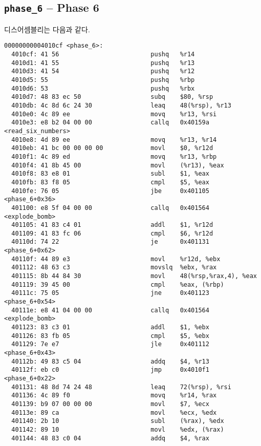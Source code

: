 \documentclass{scrartcl}
\begin{document}
\subsection{\texttt{phase\_6} -- Phase 6}
디스어셈블리는 다음과 같다.
\begin{lstlisting}
00000000004010cf <phase_6>:
  4010cf: 41 56                         pushq   %r14
  4010d1: 41 55                         pushq   %r13
  4010d3: 41 54                         pushq   %r12
  4010d5: 55                            pushq   %rbp
  4010d6: 53                            pushq   %rbx
  4010d7: 48 83 ec 50                   subq    $80, %rsp
  4010db: 4c 8d 6c 24 30                leaq    48(%rsp), %r13
  4010e0: 4c 89 ee                      movq    %r13, %rsi
  4010e3: e8 b2 04 00 00                callq   0x40159a <read_six_numbers>
  4010e8: 4d 89 ee                      movq    %r13, %r14
  4010eb: 41 bc 00 00 00 00             movl    $0, %r12d
  4010f1: 4c 89 ed                      movq    %r13, %rbp
  4010f4: 41 8b 45 00                   movl    (%r13), %eax
  4010f8: 83 e8 01                      subl    $1, %eax
  4010fb: 83 f8 05                      cmpl    $5, %eax
  4010fe: 76 05                         jbe     0x401105 <phase_6+0x36>
  401100: e8 5f 04 00 00                callq   0x401564 <explode_bomb>
  401105: 41 83 c4 01                   addl    $1, %r12d
  401109: 41 83 fc 06                   cmpl    $6, %r12d
  40110d: 74 22                         je      0x401131 <phase_6+0x62>
  40110f: 44 89 e3                      movl    %r12d, %ebx
  401112: 48 63 c3                      movslq  %ebx, %rax
  401115: 8b 44 84 30                   movl    48(%rsp,%rax,4), %eax
  401119: 39 45 00                      cmpl    %eax, (%rbp)
  40111c: 75 05                         jne     0x401123 <phase_6+0x54>
  40111e: e8 41 04 00 00                callq   0x401564 <explode_bomb>
  401123: 83 c3 01                      addl    $1, %ebx
  401126: 83 fb 05                      cmpl    $5, %ebx
  401129: 7e e7                         jle     0x401112 <phase_6+0x43>
  40112b: 49 83 c5 04                   addq    $4, %r13
  40112f: eb c0                         jmp     0x4010f1 <phase_6+0x22>
  401131: 48 8d 74 24 48                leaq    72(%rsp), %rsi
  401136: 4c 89 f0                      movq    %r14, %rax
  401139: b9 07 00 00 00                movl    $7, %ecx
  40113e: 89 ca                         movl    %ecx, %edx
  401140: 2b 10                         subl    (%rax), %edx
  401142: 89 10                         movl    %edx, (%rax)
  401144: 48 83 c0 04                   addq    $4, %rax

\end{lstlisting}
\end{document}
